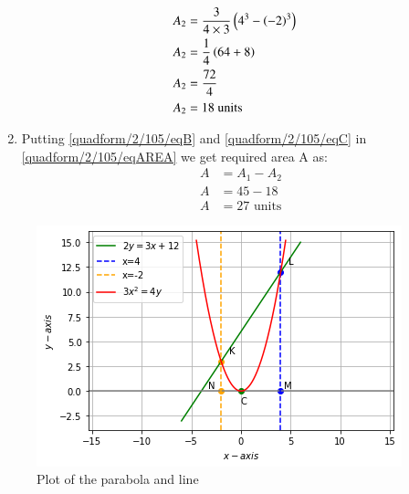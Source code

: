 \begin{enumerate}
\begin{align}
    \\
    A_2&= \frac{3}{4\times3} \left(4^3-\left(-2\right)^3\right)
    \\
    A_2&= \frac{1}{4} \left(64 +8\right)
    \\
    A_2&= \frac{72}{4} 
    \\
    A_2&= 18 \text{ units} \label{quadform/2/105/eqC}
\end{align}
\item Putting \eqref{quadform/2/105/eqB} and \eqref{quadform/2/105/eqC} in \eqref{quadform/2/105/eqAREA} we get required area A as:
\begin{align}
 A &= A_1 -A_2 
 \\
 A &= 45-18
 \\
 A &= 27 \text{ units}
\end{align}
%
\end{enumerate}
\begin{figure}[ht]
\centering
\includegraphics[width=\columnwidth]{solutions/su2021/2/105/LINE AND PARABOLA.png}
\caption{Plot of the parabola and line}
\label{quadform/2/105/Plot of the Parabola and line}
\end{figure}
